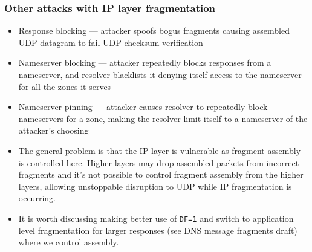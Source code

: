 \documentclass{beamer}
\begin{document}
\frame
{
  \frametitle{Other attacks with IP layer fragmentation}

  \begin{itemize}
  \item Response blocking --- attacker spoofs bogus fragments causing
    assembled UDP datagram to fail UDP checksum verification
  \item Nameserver blocking --- attacker repeatedly blocks responses
    from a nameserver, and resolver blacklists it denying itself access
    to the nameserver for all the zones it serves
  \item Nameserver pinning --- attacker causes resolver to repeatedly
    block nameservers for a zone, making the resolver limit itself to a
    nameserver of the attacker's choosing
  \item The general problem is that the IP layer is vulnerable as
    fragment assembly is controlled here. Higher layers may drop
    assembled packets from incorrect fragments and it's not possible to
    control fragment assembly from the higher layers, allowing
    unstoppable disruption to UDP while IP fragmentation is occurring.
  \item It is worth discussing making better use of \texttt{DF=1} and
    switch to application level fragmentation for larger responses (see
    DNS message fragments draft) where we control assembly.
  \end{itemize}
}
\end{document}
